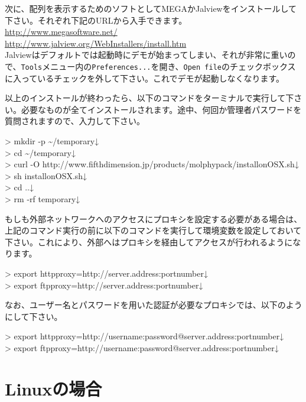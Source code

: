 \documentclass[titlepage,10pt,a4paper]{jsbook}
\newenvironment{cmd}{\begin{oframed}\raggedright\ttfamily\footnotesize\setlength{\baselineskip}{1.4em}}{\end{oframed}\vspace{-1em}}
\begin{document}
次に、配列を表示するためのソフトとしてMEGAかJalviewをインストールして下さい。それぞれ下記のURLから入手できます。\\
\href{http://www.megasoftware.net/}{http://www.megasoftware.net/}\\
\href{http://www.jalview.org/Web_Installers/install.htm}{http://www.jalview.org/Web{\textunderscore}Installers/install.htm}\\
Jalviewはデフォルトでは起動時にデモが始まってしまい、それが非常に重いので、\texttt{Tools}メニュー内の\texttt{Preferences...}を開き、\texttt{Open file}のチェックボックスに入っているチェックを外して下さい。これでデモが起動しなくなります。

以上のインストールが終わったら、以下のコマンドをターミナルで実行して下さい。必要なものが全てインストールされます。途中、何回か管理者パスワードを質問されますので、入力して下さい。
\begin{cmd}
{\textgreater} mkdir -p {\textasciitilde}/temporary↓\\
{\textgreater} cd {\textasciitilde}/temporary↓\\
{\textgreater} curl -O http://www.fifthdimension.jp/products/molphypack/install{\textunderscore}on{\textunderscore}OSX.sh↓\\
{\textgreater} sh install{\textunderscore}on{\textunderscore}OSX.sh↓\\
{\textgreater} cd ..↓\\
{\textgreater} rm -rf temporary↓
\end{cmd}
もしも外部ネットワークへのアクセスにプロキシを設定する必要がある場合は、上記のコマンド実行の前に以下のコマンドを実行して環境変数を設定しておいて下さい。これにより、外部へはプロキシを経由してアクセスが行われるようになります。
\begin{cmd}
{\textgreater} export http{\textunderscore}proxy=http://server.address:portnumber↓\\
{\textgreater} export ftp{\textunderscore}proxy=http://server.address:portnumber↓
\end{cmd}
なお、ユーザー名とパスワードを用いた認証が必要なプロキシでは、以下のようにして下さい。
\begin{cmd}
{\textgreater} export http{\textunderscore}proxy=http://username:password@server.address:portnumber↓\\
{\textgreater} export ftp{\textunderscore}proxy=http://username:password@server.address:portnumber↓
\end{cmd}

\section{Linuxの場合}
\end{document}

